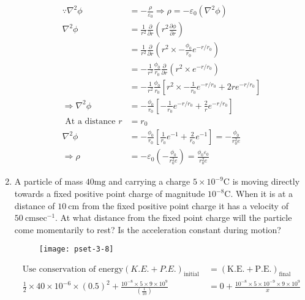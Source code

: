 \begin{enumerate}[label=\color{ocre}\textbf{\arabic*.}]
	\begin{answer}
		\begin{align*}
		\because \nabla^{2} \phi&=-\frac{\rho}{\varepsilon_{0}} \Rightarrow \rho=-\varepsilon_{0}\left(\nabla^{2} \phi\right) \\
		\nabla^{2} \phi&=\frac{1}{r^{2}} \frac{\partial}{\partial r}\left(r^{2} \frac{\partial \phi}{\partial r}\right)\\
		&=\frac{1}{r^{2}} \frac{\partial}{\partial r}\left(r^{2} \times-\frac{\phi_{0}}{r_{0}} e^{-r / r_{0}}\right)\\&=-\frac{1}{r^{2}} \frac{\phi_{0}}{r_{0}} \frac{\partial}{\partial r}\left(r^{2} \times e^{-r / r_{0}}\right) \\
		&=-\frac{1}{r^{2}} \frac{\phi_{0}}{r_{0}}\left[r^{2} \times-\frac{1}{r_{0}} e^{-r / r_{0}}+2 r e^{-r / r_{0}}\right] \\\Rightarrow \nabla^{2} \phi&=-\frac{\phi_{0}}{r_{0}}\left[-\frac{1}{r_{0}} e^{-r / r_{0}}+\frac{2}{r} e^{-r / r_{0}}\right] \\
		\text { At a distance } r&=r_{0}\\ \nabla^{2} \phi&=-\frac{\phi_{0}}{r_{0}}\left[\frac{1}{r_{0}} e^{-1}+\frac{2}{r_{0}} e^{-1}\right]=-\frac{\phi_{0}}{r_{0}^{2} e} \\\Rightarrow \rho&=-\varepsilon_{0}\left(-\frac{\phi_{0}}{r_{0}^{2} e}\right)=\frac{\phi_{0} \varepsilon_{0}}{r_{0}^{2} e}
		\end{align*}
	\end{answer}
	\item A particle of mass $40 \mathrm{mg}$ and carrying a charge $5 \times 10^{-9} \mathrm{C}$ is moving directly towards a fixed positive point charge of magnitude $10^{-8} \mathrm{C} .$ When it is at a distance of $10 \mathrm{~cm}$ from the fixed positive point charge it has a velocity of $50 \mathrm{~cm} \mathrm{sec}^{-1}$. At what distance from the fixed point charge will the particle come momentarily to rest? Is the acceleration constant during motion?
	\begin{figure}[H]
		\begin{center}
			\texttt{[image: pset-3-8]}
		\end{center}
	\end{figure}
	\begin{answer}
		\begin{align*}
		\text{Use conservation of energy} (K.E. + P.E.) _{\text {initial }}&=(\mathrm{K.E.}+\mathrm{P.E.})_{\text {final }}\\
		\frac{1}{2} \times 40 \times 10^{-6} \times(0.5)^{2}+\frac{10^{-8} \times 5 \times 9 \times 10^{9}}{\left(\frac{1}{10}\right)}&=0+\frac{10^{-8} \times 5 \times 10^{-9} \times 9 \times 10^{9}}{x}\\

\end{align*}
\end{answer}
\end{enumerate}
